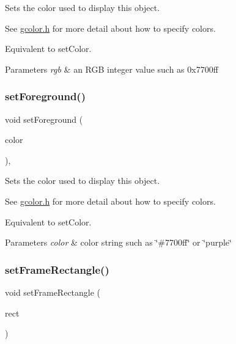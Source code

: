 Sets the color used to display this object. 

See \mbox{\hyperlink{gcolor_8h_source}{gcolor.\+h}} for more detail about how to specify colors.

Equivalent to set\+Color.


\begin{DoxyParams}{Parameters}
{\em rgb} & an R\+GB integer value such as 0x7700ff \\
\hline
\end{DoxyParams}
\mbox{\label{classsgl_1_1GObject_af59209aeadea6dfc6d97a2d8531f50e1}} 
\subsubsection{\texorpdfstring{set\+Foreground()}{setForeground()}\hspace{0.1cm}{\footnotesize\ttfamily [3/3]}}
{\footnotesize\ttfamily void set\+Foreground (\begin{DoxyParamCaption}\item[{const std\+::string \&}]{color }\end{DoxyParamCaption})\hspace{0.3cm}{\ttfamily [virtual]}, {\ttfamily [inherited]}}



Sets the color used to display this object. 

See \mbox{\hyperlink{gcolor_8h_source}{gcolor.\+h}} for more detail about how to specify colors.

Equivalent to set\+Color.


\begin{DoxyParams}{Parameters}
{\em color} & color string such as \char`\"{}\#7700ff\char`\"{} or \char`\"{}purple\char`\"{} \\
\hline
\end{DoxyParams}
\mbox{\label{classsgl_1_1GArc_a53c45f6939e63ae1ee26739e7c485e2d}} 
\subsubsection{\texorpdfstring{set\+Frame\+Rectangle()}{setFrameRectangle()}\hspace{0.1cm}{\footnotesize\ttfamily [1/2]}}
{\footnotesize\ttfamily void set\+Frame\+Rectangle (\begin{DoxyParamCaption}\item[{const \mbox{\hyperlink{structsgl_1_1GRectangle}{G\+Rectangle}} \&}]{rect }\end{DoxyParamCaption})\hspace{0.3cm}{\ttfamily [virtual]}}



